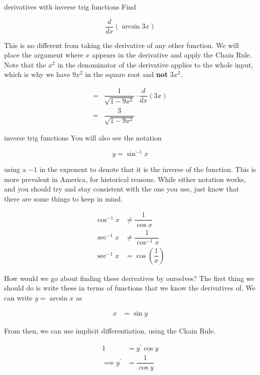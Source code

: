 \begin{example}{derivatives with inverse trig functions}
    Find
    
    \[ \dfrac{d}{dx} \left( \arcsin{3x} \right) \]
    
    This is no different from taking the derivative of any other function. We will place the argument where \( x \) appears in the derivative and apply the Chain Rule. Note that the \( x^2 \) in the denominator of the derivative applies to the whole input, which is why we have \( 9x^2 \) in the square root and \textbf{not} \( 3x^2 \).
    
    \begin{align}
        = &\dfrac{1}{\sqrt{1 - 9x^2}} \cdot \dfrac{d}{dx} \left( 3x \right) \\
        = &\dfrac{3}{\sqrt{1 - 9x^2}}
    \end{align}
\end{example}

\begin{notation}{inverse trig functions}
    You will also see the notation
    
    \[ y = \sin^{-1}{x} \]
    
    using a \( -1 \) in the exponent to denote that it is the inverse of the function. This is more prevalent in America, for historical reasons. While either notation works, and you should try and stay consistent with the one you use, just know that there are some things to keep in mind.
    
    \begin{align*}
        \cos^{-1}{x} &\ne \dfrac{1}{\cos{x}} \\
        \sec^{-1}{x} &\ne \dfrac{1}{\cos^{-1}{x}} \\
        \sec^{-1}{x} &= \cos{\left( \dfrac{1}{x} \right)}
    \end{align*}
\end{notation}

How would we go about finding these derivatives by ourselves? The first thing we should do is write these in terms of functions that we know the derivatives of. We can write \( y = \arcsin{x} \) as

\begin{align}
    x &= \sin{y}
\end{align}

From then, we can use implicit differentiation, using the Chain Rule.

\begin{align}
    1 &= y^\prime \cos{y} \\
    \implies y^\prime &= \dfrac{1}{\cos{y}}
\end{align}


